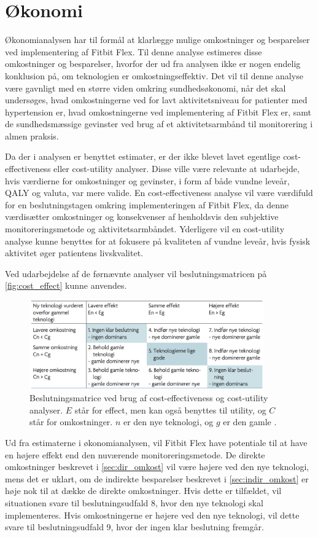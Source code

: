 \section{Økonomi} \label{sec:dis_oekonomi}
Økonomianalysen har til formål at klarlægge mulige omkostninger og besparelser ved implementering af Fitbit Flex. Til denne analyse estimeres disse omkostninger og besparelser, hvorfor der ud fra analysen ikke er nogen endelig konklusion på, om teknologien er omkostningseffektiv. Det vil til denne analyse være gavnligt med en større viden omkring sundhedsøkonomi, når det skal undersøges, hvad omkostningerne ved for lavt aktivitetsniveau for patienter med hypertension er, hvad omkostningerne ved implementering af Fitbit Flex er, samt de sundhedsmæssige gevinster ved brug af et aktivitetsarmbånd til monitorering i almen praksis. 

Da der i analysen er benyttet estimater, er der ikke blevet lavet egentlige cost-effectiveness eller cost-utility analyser. Disse ville være relevante at udarbejde, hvis værdierne for omkostninger og gevinster, i form af både vundne leveår, QALY og valuta, var mere valide. En cost-effectiveness analyse vil være værdifuld for en beslutningstagen omkring implementeringen af Fitbit Flex, da denne værdisætter omkostninger og konsekvenser af henholdsvis den subjektive monitoreringsmetode og aktivitetsarmbåndet. Yderligere vil en cost-utility analyse kunne benyttes for at fokusere på kvaliteten af vundne leveår, hvis fysisk aktivitet øger patientens livskvalitet.

Ved udarbejdelse af de førnævnte analyser vil beslutningsmatricen på \autoref{fig:cost_effect} kunne anvendes. 

\begin{figure}[H]
	\centering
	\includegraphics[width=0.9\textwidth]{figures/cost-effectiveness}
	\caption{Beslutningsmatrice ved brug af cost-effectiveness og cost-utility analyser. $E$ står for effect, men kan også benyttes til utility, og $C$ står for omkostninger. $n$ er den nye teknologi, og $g$ er den gamle \citep{mtvhaandbog}.}
	\label{fig:cost_effect}
\end{figure}

Ud fra estimaterne i økonomianalysen, vil Fitbit Flex have potentiale til at have en højere effekt end den nuværende monitoreringsmetode. De direkte omkostninger beskrevet i \autoref{sec:dir_omkost} vil være højere ved den nye teknologi, mens det er uklart, om de indirekte besparelser beskrevet i \autoref{sec:indir_omkost} er høje nok til at dække de direkte omkostninger. Hvis dette er tilfældet, vil situationen svare til beslutningsudfald 8, hvor den nye teknologi skal implementeres. Hvis omkostningerne er højere ved den nye teknologi, vil dette svare til beslutningsudfald 9, hvor der ingen klar beslutning fremgår. 